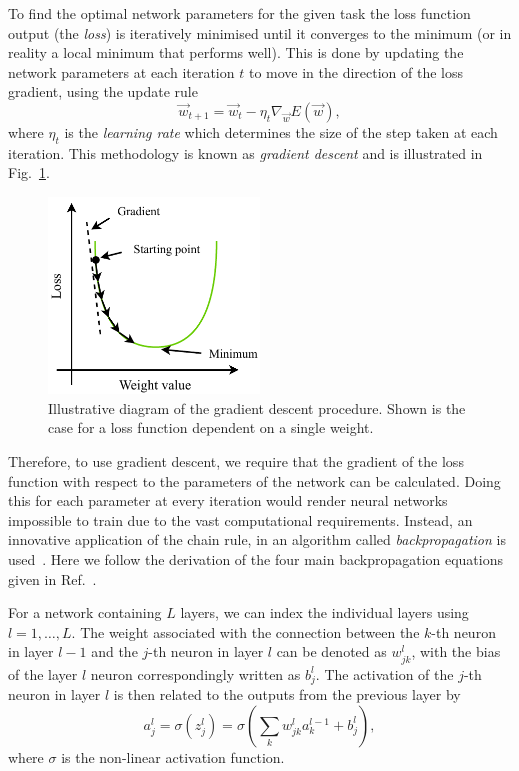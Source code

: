 To find the optimal network parameters for the given task the loss function output (the
\emph{loss}) is iteratively minimised until it converges to the minimum (or in reality a local
minimum that performs well). This is done by updating the network parameters at each iteration $t$
to move in the direction of the loss gradient, using the update rule
\begin{equation} %
    \vec{w}_{t+1}=\vec{w}_{t}-\eta_{t}\nabla_{\vec{w}}E(\vec{w}),
    \label{eq:update_rule}
\end{equation}
where $\eta_{t}$ is the \emph{learning rate} which determines the size of the step taken at each
iteration. This methodology is known as \emph{gradient descent} and is illustrated in
Fig.~\ref{fig:gradient_descent}.

\begin{figure} %
    \includegraphics[width=0.5\textwidth]{diagrams/6-cnn/gradient_descent.pdf}
    \caption[Illustrative diagram of the gradient descent process]
    {Illustrative diagram of the gradient descent procedure. Shown is the case for a loss function
        dependent on a single weight.}
    \label{fig:gradient_descent}
\end{figure}

Therefore, to use gradient descent, we require that the gradient of the loss function with respect
to the parameters of the network can be calculated. Doing this for each parameter at every
iteration would render neural networks impossible to train due to the vast computational
requirements. Instead, an innovative application of the chain rule, in an algorithm called
\emph{backpropagation} is used~\cite{werbos1974}. Here we follow the derivation of the four main
backpropagation equations given in Ref.~\cite{mehta2019}.

For a network containing $L$ layers, we can index the individual layers using $l=1,\dots,L$. The
weight associated with the connection between the $k$-th neuron in layer $l-1$ and the $j$-th
neuron in layer $l$ can be denoted as $w^{l}_{jk}$, with the bias of the layer $l$ neuron
correspondingly written as $b^{l}_{j}$. The activation of the $j$-th neuron in layer $l$ is then
related to the outputs from the previous layer by
\begin{equation} %
    a^{l}_{j}=\sigma(z^{l}_{j})=\sigma\left(\sum_{k}w^{l}_{jk}a^{l-1}_{k}+b^{l}_{j}\right),
    \label{eq:feedforward}
\end{equation}
where $\sigma$ is the non-linear activation function.

